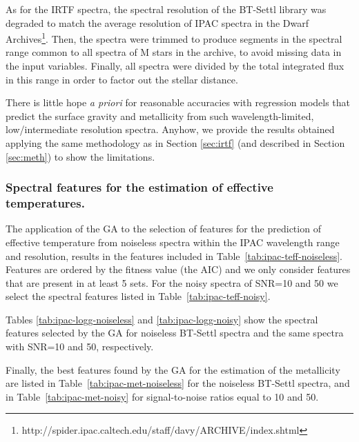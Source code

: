
As for the IRTF spectra, the spectral resolution of the BT-Settl
library was degraded to match the average resolution of IPAC spectra
in the Dwarf
Archives\footnote{http://spider.ipac.caltech.edu/staff/davy/ARCHIVE/index.shtml}. Then,
the spectra were trimmed to produce segments in the spectral range
common to all spectra of M stars in the archive, to avoid missing data
in the input variables. Finally, all spectra were divided by the total
integrated flux in this range in order to factor out the stellar
distance.

There is little hope {\it a priori} for reasonable accuracies with
regression models that predict the surface gravity and metallicity
from such wavelength-limited, low/intermediate resolution
spectra. Anyhow, we provide the results obtained applying the same
methodology as in Section \ref{sec:irtf} (and described in
Section \ref{sec:meth}) to show the limitations.

\subsubsection{Spectral features for the estimation of effective temperatures.}

The application of the GA to the selection of features for the
prediction of effective temperature from noiseless spectra within the
IPAC wavelength range and resolution, results in the features included
in Table~\ref{tab:ipac-teff-noiseless}. Features are ordered by the
fitness value (the AIC) and we only consider features that are present
in at least 5 sets. For the noisy spectra of SNR=10 and 50 we select
the spectral features listed in Table~\ref{tab:ipac-teff-noisy}.

Tables \ref{tab:ipac-logg-noiseless} and \ref{tab:ipac-logg-noisy}
show the spectral features selected by the GA for noiseless BT-Settl
spectra and the same spectra with SNR=10 and 50, respectively.

Finally, the best features found by the GA for the estimation of the
metallicity are listed in Table~\ref{tab:ipac-met-noiseless} for the
noiseless BT-Settl spectra, and in Table~\ref{tab:ipac-met-noisy} for
signal-to-noise ratios equal to 10 and 50.

